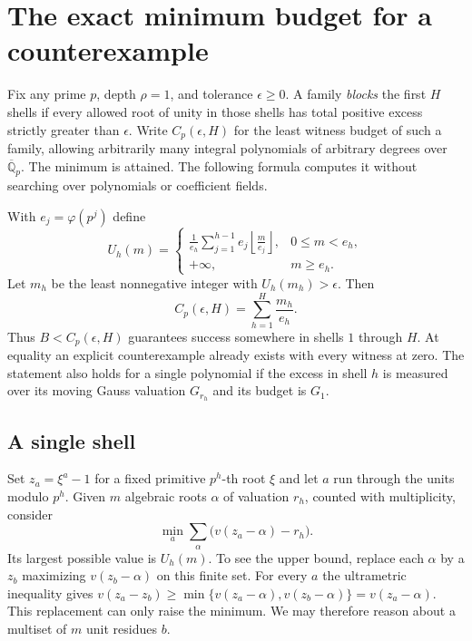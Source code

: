 \section{The exact minimum budget for a counterexample}
\label{sec:exact}
Fix any prime $p$, depth $\rho=1$, and tolerance $\epsilon\ge0$. A family
\emph{blocks} the first $H$ shells if every allowed root of unity in those shells
has total positive excess strictly greater than $\epsilon$. Write
$C_p(\epsilon,H)$ for the least witness budget of such a family, allowing
arbitrarily many integral polynomials of arbitrary degrees over
$\overline{\mathbb Q}_p$. The minimum is attained. The following formula
computes it without searching over polynomials or coefficient fields.

\begin{theorem}\label{th:cost}
With $e_j=\varphi(p^j)$ define
\[
 U_h(m)=
 \begin{cases}
 \displaystyle\frac{1}{e_h}\sum_{j=1}^{h-1}e_j
                  \left\lfloor\frac{m}{e_j}\right\rfloor,&0\le m<e_h,\\[5pt]
 +\infty,& m\ge e_h .
 \end{cases}
\]
Let $m_h$ be the least nonnegative integer with $U_h(m_h)>\epsilon$. Then
\[
 \boxed{\displaystyle C_p(\epsilon,H)=\sum_{h=1}^H\frac{m_h}{e_h}.}
\]
Thus $B<C_p(\epsilon,H)$ guarantees success somewhere in shells $1$ through $H$.
At equality an explicit counterexample already exists with every witness at zero.
The statement also holds for a single polynomial if the excess in shell $h$ is
measured over its moving Gauss valuation $G_{r_h}$ and its budget is $G_1$.
\end{theorem}

\subsection*{A single shell}
Set $z_a=\xi^a-1$ for a fixed primitive $p^h$-th root $\xi$ and let $a$ run through
the units modulo $p^h$. Given $m$ algebraic roots $\alpha$ of valuation $r_h$,
counted with multiplicity, consider
\[
 \min_{a}\sum_\alpha \big(v(z_a-\alpha)-r_h\big).
\]
Its largest possible value is $U_h(m)$. To see the upper bound, replace each
$\alpha$ by a $z_b$ maximizing $v(z_b-\alpha)$ on this finite set.
For every $a$ the ultrametric inequality gives
$v(z_a-z_b)\ge\min\{v(z_a-\alpha),v(z_b-\alpha)\}=v(z_a-\alpha)$.
This replacement can only raise the minimum. We may therefore reason about a
multiset of $m$ unit residues $b$.

